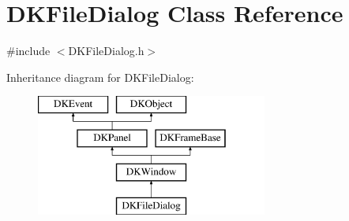 \hypertarget{class_d_k_file_dialog}{\section{D\-K\-File\-Dialog Class Reference}
\label{class_d_k_file_dialog}
}


{\ttfamily \#include $<$D\-K\-File\-Dialog.\-h$>$}

Inheritance diagram for D\-K\-File\-Dialog\-:\begin{figure}[H]
\begin{center}
\leavevmode
\includegraphics[height=4.000000cm]{class_d_k_file_dialog}
\end{center}
\end{figure}
